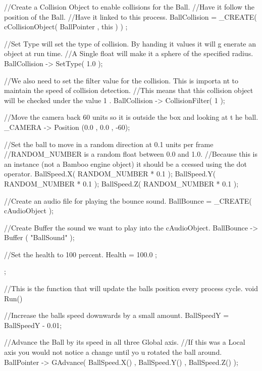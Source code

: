 \begin{DoxyCode}
{{        //Create a Collision Object to enable collisions for the Ball.
        //Have it follow the position of the Ball.
        //Have it linked to this process.
                BallCollision = _CREATE( cCollisionObject( BallPointer , this ) )
      ;

        //Set Type will set the type of collision. By handing it values it will g
      enerate an object at run time.
        //A Single float will make it a sphere of the specified radius.
                BallCollision -> SetType( 1.0 );

        //We also need to set the filter value for the collision. This is importa
      nt to maintain the speed of collision detection.
        //This means that this collision object will be checked under the value 1
      .
                BallCollision -> CollisionFilter( 1 );

        //Move the camera back 60 units so it is outside the box and looking at t
      he ball.
                _CAMERA -> Position (0.0 , 0.0 , -60);

        //Set the ball to move in a random direction at 0.1 units per frame
        //RANDOM_NUMBER is a random float between 0.0 and 1.0.
        //Because this is an instance (not a Bamboo engine object) it should be a
      ccessed using the dot operator.
                BallSpeed.X( RANDOM_NUMBER * 0.1 );
                BallSpeed.Y( RANDOM_NUMBER * 0.1 );
                BallSpeed.Z( RANDOM_NUMBER * 0.1 );

        //Create an audio file for playing the bounce sound.
                BallBounce = _CREATE( cAudioObject );

        //Create Buffer the sound we want to play into the cAudioObject.
                BallBounce -> Buffer ( "BallSound" );

        //Set the health to 100 percent.
                Health = 100.0 ;

        };

        //This is the function that will update the balls position every process 
      cycle.
        void Run()
        {
                //Increase the balls speed downwards by a small amount.
                        BallSpeedY = BallSpeedY - 0.01;

                //Advance the Ball by its speed in all three Global axis.
                //If this was a Local axis you would not notice a change until yo
      u rotated the ball around.
                        BallPointer -> GAdvance( BallSpeed.X() , BallSpeed.Y() , 
      BallSpeed.Z() );

}}
\end{DoxyCode}
